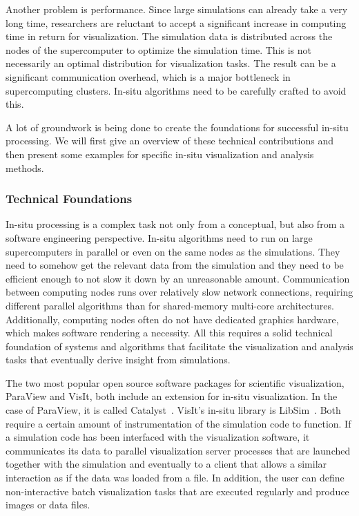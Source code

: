 %
Another problem is performance.
%
Since large simulations can already take a very long time, researchers are
reluctant to accept a significant increase in computing time in return for
visualization.
%
The simulation data is distributed across the nodes of the supercomputer to
optimize the simulation time.
%
This is not necessarily an optimal distribution for visualization tasks.
%
The result can be a significant communication overhead, which is a major
bottleneck in supercomputing clusters.
%
In-situ algorithms need to be carefully crafted to avoid this.
%

%
A lot of groundwork is being done to create the foundations for successful
in-situ processing.
%
We will first give an overview of these technical contributions and then present
some examples for specific in-situ visualization and analysis methods.
%
\subsubsection{Technical Foundations} %
\label{ssub:technical_foundations}
%
In-situ processing is a complex task not only from a conceptual, but also from a
software engineering perspective.
%
In-situ algorithms need to run on large supercomputers in parallel or even on
the same nodes as the simulations.
%
They need to somehow get the relevant data from the simulation and they need to
be efficient enough to not slow it down by an unreasonable amount.
%
Communication between computing nodes runs over relatively slow network
connections, requiring different parallel algorithms than for shared-memory
multi-core architectures.
%
Additionally, computing nodes often do not have dedicated graphics hardware,
which makes software rendering a necessity.
%
All this requires a solid technical foundation of systems and algorithms that
facilitate the visualization and analysis tasks that eventually derive insight
from simulations.
%

%
The two most popular open source software packages for scientific visualization,
ParaView and VisIt, both include an extension for in-situ visualization.
%
In the case of ParaView, it is called Catalyst~\cite{Ayachit2015}.
%
VisIt's in-situ library is LibSim~\cite{Whitlock2011}.
%
Both require a certain amount of instrumentation of the simulation code to
function.
%
If a simulation code has been interfaced with the visualization software, it
communicates its data to parallel visualization server processes that are
launched together with the simulation and eventually to a client that
allows a similar interaction as if the data was loaded from a file.
%
In addition, the user can define non-interactive batch visualization tasks that
are executed regularly and produce images or data files.
%

